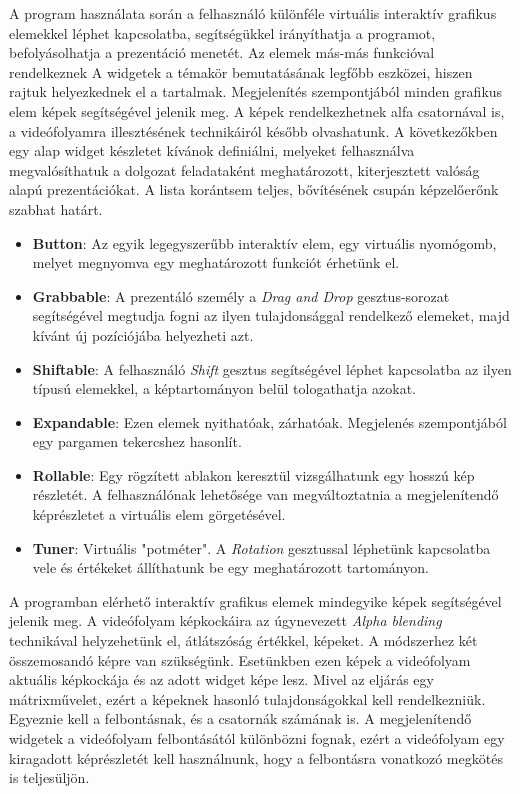 

A program használata során a felhasználó különféle virtuális interaktív grafikus elemekkel léphet kapcsolatba, segítségükkel irányíthatja a programot, befolyásolhatja a prezentáció menetét. Az elemek más-más funkcióval rendelkeznek A widgetek a témakör bemutatásának legfőbb eszközei, hiszen rajtuk helyezkednek el a tartalmak. Megjelenítés szempontjából minden grafikus elem képek segítségével jelenik meg. A képek rendelkezhetnek alfa csatornával is, a videófolyamra illesztésének technikáiról később olvashatunk. A következőkben egy alap widget készletet kívánok definiálni, melyeket felhasználva megvalósíthatuk a dolgozat feladataként meghatározott, kiterjesztett valóság alapú prezentációkat. A lista korántsem teljes, bővítésének csupán képzelőerőnk szabhat határt.
\begin{itemize}
	\item \textbf{Button}: Az egyik legegyszerűbb interaktív elem, egy virtuális nyomógomb, melyet megnyomva egy meghatározott funkciót érhetünk el.
	\item \textbf{Grabbable}: A prezentáló személy a \textit{Drag and Drop} gesztus-sorozat segítségével megtudja fogni az ilyen tulajdonsággal rendelkező elemeket, majd kívánt új pozíciójába helyezheti azt.
	\item \textbf{Shiftable}: A felhasználó \textit{Shift} gesztus segítségével léphet kapcsolatba az ilyen típusú elemekkel, a képtartományon belül tologathatja azokat.
	\item \textbf{Expandable}: Ezen elemek nyithatóak, zárhatóak. Megjelenés szempontjából egy pargamen tekercshez hasonlít.
	\item \textbf{Rollable}: Egy rögzített ablakon keresztül vizsgálhatunk egy hosszú kép részletét. A felhasználónak lehetősége van megváltoztatnia a megjelenítendő képrészletet a virtuális elem görgetésével.
	\item \textbf{Tuner}: Virtuális "potméter". A \textit{Rotation} gesztussal léphetünk kapcsolatba vele és értékeket állíthatunk be egy meghatározott tartományon.
\end{itemize}


A programban elérhető interaktív grafikus elemek mindegyike képek segítségével jelenik meg. A videófolyam képkockáira az úgynevezett \textit{Alpha blending}\cite{salvi2014multi} technikával helyzehetünk el, átlátszóság értékkel, képeket. A módszerhez két összemosandó képre van szükségünk. Esetünkben ezen képek a videófolyam aktuális képkockája és az adott widget képe lesz. Mivel az eljárás egy mátrixművelet, ezért a képeknek hasonló tulajdonságokkal kell rendelkezniük. Egyeznie kell a felbontásnak, és a csatornák számának is. A megjelenítendő widgetek a videófolyam felbontásától különbözni fognak, ezért a videófolyam egy kiragadott képrészletét kell használnunk, hogy a felbontásra vonatkozó megkötés is teljesüljön.

